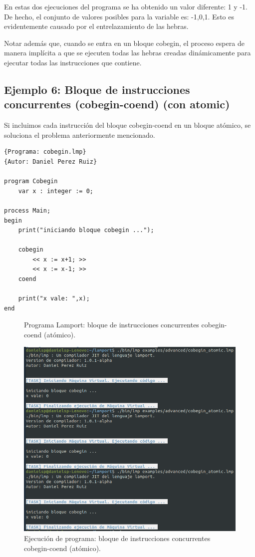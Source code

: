En estas dos ejecuciones del programa se ha obtenido un valor diferente: 1 y -1. De hecho, el conjunto de valores posibles para la variable  es: -1,0,1. Esto es evidentemente causado por el entrelazamiento de las hebras.

\vspace{0.5cm}
Notar además que, cuando se entra en un bloque cobegin, el proceso  espera de manera implícita a que se ejecuten todas las hebras creadas dinámicamente para ejecutar todas las instrucciones que contiene.

\newpage
\subsection{Ejemplo 6: Bloque de instrucciones concurrentes (cobegin-coend) (con atomic)}
Si incluimos cada instrucción del bloque cobegin-coend en un bloque atómico, se soluciona el problema anteriormente mencionado.
\begin{lstlisting}[style=lamportStyle]
{Programa: cobegin.lmp}
{Autor: Daniel Perez Ruiz}

program Cobegin
	var x : integer := 0;
	
process Main;
begin
	print("iniciando bloque cobegin ...");

	cobegin
		<< x := x+1; >>
		<< x := x-1; >>
	coend
	
	print("x vale: ",x);
end
\end{lstlisting}
\begin{figure}[h]
\caption{Programa Lamport: bloque de instrucciones concurrentes cobegin-coend (atómico).}
\label{fig:lamportCobeginAtomic}
\end{figure}

\newpage

\begin{figure}[h]
    \includegraphics[width=\linewidth]{images/ejemplos/concurrentes/cobegin_atomic.png}
    \caption{Ejecución de programa: bloque de instrucciones concurrentes cobegin-coend (atómico).}
    \label{fig:lamportCobeginAtomic_exec}
\end{figure}

